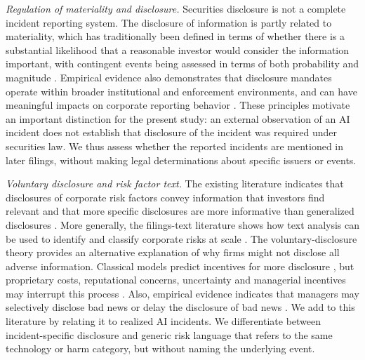 \documentclass[utf8]{FrontiersinHarvard}
\begin{document}
\textit{Regulation of materiality and disclosure.} Securities disclosure is not a complete incident reporting system. The disclosure of information is partly related to materiality, which has traditionally been defined in terms of whether there is a substantial likelihood that a reasonable investor would consider the information important, with contingent events being assessed in terms of both probability and magnitude \citep{TSC1976,Basic1988}. Empirical evidence also demonstrates that disclosure mandates operate within broader institutional and enforcement environments, and can have meaningful impacts on corporate reporting behavior \citep{ChristensenHailLeuz2016,LeuzWysocki2016}. These principles motivate an important distinction for the present study: an external observation of an AI incident does not establish that disclosure of the incident was required under securities law. We thus assess whether the reported incidents are mentioned in later filings, without making legal determinations about specific issuers or events.

\textit{Voluntary disclosure and risk factor text.} The existing literature indicates that disclosures of corporate risk factors convey information that investors find relevant \citep{Campbell2014,KravetMuslu2013} and that more specific disclosures are more informative than generalized disclosures \citep{Hope2016}. More generally, the filings-text literature shows how text analysis can be used to identify and classify corporate risks at scale \citep{LoughranMcDonald2011,BaoDatta2014}. The voluntary-disclosure theory provides an alternative explanation of why firms might not disclose all adverse information. Classical models predict incentives for more disclosure \citep{Grossman1981,Milgrom1981}, but proprietary costs, reputational concerns, uncertainty and managerial incentives may interrupt this process \citep{Dye1985,Verrecchia2001,HealyPalepu2001}. Also, empirical evidence indicates that managers may selectively disclose bad news or delay the disclosure of bad news \citep{Skinner1994,KothariShuWysocki2009,Beyer2010}. We add to this literature by relating it to realized AI incidents. We differentiate between incident-specific disclosure and generic risk language that refers to the same technology or harm category, but without naming the underlying event.
\end{document}
